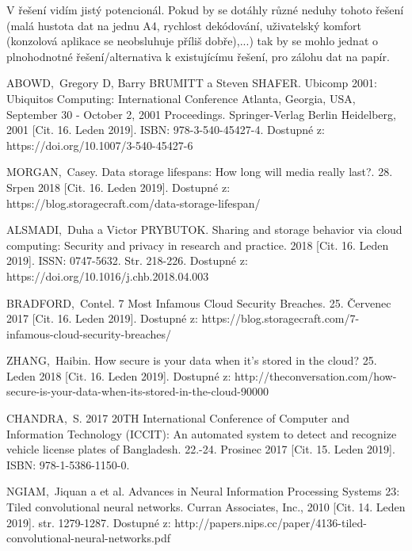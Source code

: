 \documentclass[conference]{IEEEtran}
\begin{document}
V řešení vidím jistý potencionál. Pokud by se dotáhly různé neduhy tohoto řešení (malá hustota dat na jednu A4, rychlost dekódování, uživatelský komfort (konzolová aplikace se neobsluhuje příliš dobře),...) tak by se mohlo jednat o plnohodnotné řešení/alternativa k existujícímu řešení, pro zálohu dat na papír.

\begin{thebibliography}{1}

ABOWD,~Gregory D, Barry BRUMITT a Steven SHAFER. Ubicomp 2001: Ubiquitos Computing: International Conference Atlanta, Georgia, USA, September 30 - October 2, 2001 Proceedings. Springer-Verlag Berlin Heidelberg, 2001 [Cit. 16. Leden 2019]. ISBN: 978-3-540-45427-4. Dostupné z: https://doi.org/10.1007/3-540-45427-6

MORGAN,~Casey. Data storage lifespans: How long will media really last?. 28. Srpen 2018 [Cit. 16. Leden 2019]. Dostupné z: https://blog.storagecraft.com/data-storage-lifespan/
	
ALSMADI,~Duha a Victor PRYBUTOK. Sharing and storage behavior via cloud computing: Security and privacy in research and practice. 2018 [Cit. 16. Leden 2019]. ISSN: 0747-5632. Str. 218-226. Dostupné z: https://doi.org/10.1016/j.chb.2018.04.003

BRADFORD,~Contel. 7 Most Infamous Cloud Security Breaches. 25. Červenec 2017 [Cit. 16. Leden 2019]. Dostupné z: https://blog.storagecraft.com/7-infamous-cloud-security-breaches/

ZHANG,~Haibin. How secure is your data when it’s stored in the cloud? 25. Leden 2018 [Cit. 16. Leden 2019]. Dostupné z: http://theconversation.com/how-secure-is-your-data-when-its-stored-in-the-cloud-90000

CHANDRA,~S. 2017 20TH International Conference of Computer and Information Technology (ICCIT): An automated system to detect and recognize vehicle license plates of Bangladesh. 22.-24. Prosinec 2017 [Cit. 15. Leden 2019]. ISBN: 978-1-5386-1150-0. 
	
NGIAM,~Jiquan a et al. Advances in Neural Information Processing Systems 23: Tiled convolutional neural networks. Curran Associates, Inc., 2010 [Cit. 14. Leden 2019]. str. 1279-1287. Dostupné z: http://papers.nips.cc/paper/4136-tiled-convolutional-neural-networks.pdf 


\end{thebibliography}
\end{document}
